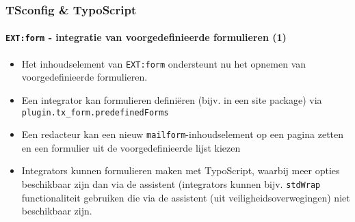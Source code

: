 \begin{frame}[fragile]
	\frametitle{TSconfig \& TypoScript}
	\framesubtitle{\texttt{EXT:form} - integratie van voorgedefinieerde formulieren (1)}

	\lstset{basicstyle=\tiny\ttfamily}

	\begin{itemize}

		\item Het inhoudselement van \texttt{EXT:form} ondersteunt nu het opnemen van
			voorgedefinieerde formulieren.

		\item Een integrator kan formulieren definiëren (bijv. in een site package) via
			\texttt{plugin.tx\_form.predefinedForms}

		\item Een redacteur kan een nieuw \texttt{mailform}-inhoudselement op een pagina zetten en
			een formulier uit de voorgedefinieerde lijst kiezen

		\item Integrators kunnen formulieren maken met TypoScript, waarbij meer opties beschikbaar
			zijn dan via de assistent (integrators kunnen bijv. \texttt{stdWrap} functionaliteit gebruiken
			die via de assistent (uit veiligheidsoverwegingen) niet beschikbaar zijn.

	\end{itemize}

\end{frame}

